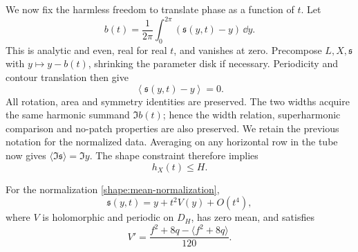 We now fix the harmless freedom to translate phase as a function of
\(t\). Let
\[
 b(t)=\frac{1}{2\pi}\int_0^{2\pi}
             (\mathfrak s(y,t)-y)\,\dd y.
\]
This is analytic and even, real for real \(t\), and vanishes at zero.
Precompose \(L,X,\mathfrak s\) with \(y\mapsto y-b(t)\), shrinking
the parameter disk if necessary. Periodicity and contour translation
then give
\begin{equation}
 \left\langle\mathfrak s(y,t)-y\right\rangle=0.
 \label{shape:mean-normalization}
\end{equation}
All rotation, area and symmetry identities are preserved. The two
widths acquire the same harmonic summand \(\Im b(t)\); hence the
width relation, superharmonic comparison and no-patch properties are
also preserved. We retain the previous notation for the normalized
data. Averaging on any horizontal row in the tube now gives
\(\langle\Im\mathfrak s\rangle=\Im y\). The shape constraint
therefore implies
\begin{equation}
 h_X(t)\leq H.
 \label{shape:width-bound}
\end{equation}

\begin{proposition}
\label{shape:first-displacement}
For the normalization \eqref{shape:mean-normalization},
\[
 \mathfrak s(y,t)=y+t^2V(y)+O(t^4),
\]
where \(V\) is holomorphic and periodic on \(D_H\), has zero mean,
and satisfies
\begin{equation}
 V'=\frac{f^2+8q-\langle f^2+8q\rangle}{120}.
 \label{eq:V-coefficient}
\end{equation}
\end{proposition}


